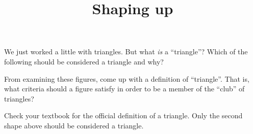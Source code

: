 \documentclass[nooutcomes,noauthor]{ximera}
\title{Shaping up}
\begin{document}
\begin{abstract}\end{abstract}
\maketitle




\begin{problem} We just worked a little with triangles.  But what {\em is} a ``triangle''?  Which of the following should be considered a triangle and why?

\begin{image}  \end{image}


From examining these figures, come up with a definition of ``triangle''.  That is, what criteria should a figure satisfy in order to be a member of the ``club'' of triangles?

\begin{solution}
Check your textbook for the official definition of a triangle.  Only the second shape above should be considered a triangle.
\end{solution}


\end{problem} 




\pagebreak
\end{document}
